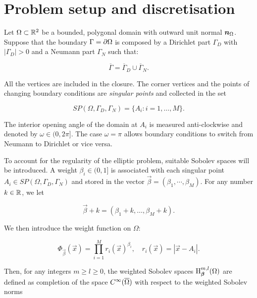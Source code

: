\documentclass[a4paper,11pt]{article}
\begin{document}
{\section{Problem setup and discretisation}
\label{sec:Problem_setup_discretisation}
Let $\Omega \subset \mathbb R^{2}$ be a bounded, polygonal domain with outward unit normal $\boldsymbol n_{\Omega}$. Suppose that the boundary $\Gamma = \partial \Omega$ is composed by a Dirichlet part $\Gamma_{D}$ with $|\Gamma_{D}| > 0$ and a Neumann part $\Gamma_{N}$ such that:


\begin{equation}\label{eq:weight_function}
    \overline{\Gamma}= \overline{\Gamma}_{D} \cup  \overline{\Gamma}_{N}.
\end{equation}

All the vertices are included in the closure. The corner vertices and the points of changing boundary conditions are \textit{singular points} and collected in the set

\begin{equation}\label{eq:corner_points}
   \textit{SP}(\Omega,\Gamma_{D},\Gamma_{N}) = \{ A_{i} : i = 1,\dots,M \}. 
\end{equation}

The interior opening angle of the domain at $A_{i}$ is measured anti-clockwise and denoted by $\omega \in (0,2\pi]$. The case $\omega = \pi$ allows boundary conditions to switch from Neumann to Dirichlet or vice versa.

To account for the regularity of the elliptic problem, suitable Sobolev spaces will be introduced. A weight $\beta_{i} \in (0,1]$ is associated with each singular point $A_{i} \in \textit{SP}(\Omega,\Gamma_{D},\Gamma_{N})$ and stored in the vector $\vec{\beta} = (\beta_{1},\cdots,\beta_{M})$. For any number $k \in \mathbb R$, we let 

$$ \vec{\beta} + k = (\beta_{1} + k,\dots,\beta_{M} + k).$$

We then introduce the weight function on $\Omega$:

\begin{equation*}
    \Phi_{\vec{\beta}}(\vec{x}) = \prod_{i=1}^{M} r_{i}(\vec{x})^{\beta_{i}}, \quad  r_{i}(\vec{x}) = |\vec{x} - A_{i}|.
\end{equation*}

Then, for any integers $m \geq l \geq 0$, the weighted Sobolev spaces $\operatorname H^{m,l}_{\boldsymbol \beta}(\Omega)$ are defined as completion of the space $C^{\infty}(\overline{\Omega})$ with respect to the weighted Sobolev norms

}
\end{document}
